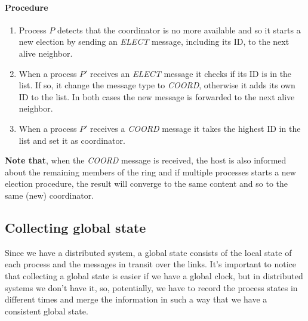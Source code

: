 \paragraph{Procedure}
\begin{enumerate}
    \item Process $P$ detects that the coordinator is no more available and so it starts a new election by sending an \textit{ELECT} message, including its ID, to the next alive neighbor.
    \item When a process $P'$ receives an \textit{ELECT} message it checks if its ID is in the list. If so, it change the message type to \textit{COORD}, otherwise it adds its own ID to the list. In both cases the new message is forwarded to the next alive neighbor. 
    \item When a process $P'$ receives a \textit{COORD} message it takes the highest ID in the list and set it as coordinator.
\end{enumerate}

\textbf{Note that}, when the \textit{COORD} message is received, the host is also informed about the remaining members of the ring and if multiple processes starts a new election procedure, the result will converge to the same content and so to the same (new) coordinator.

\subsection{Collecting global state}
Since we have a distributed system, a global state consists of the local state of each process and the messages in transit over the links. It's important to notice that collecting a global state is easier if we have a global clock, but in distributed systems we don't have it, so, potentially, we have to record the process states in different times and merge the information in such a way that we have a consistent global state.